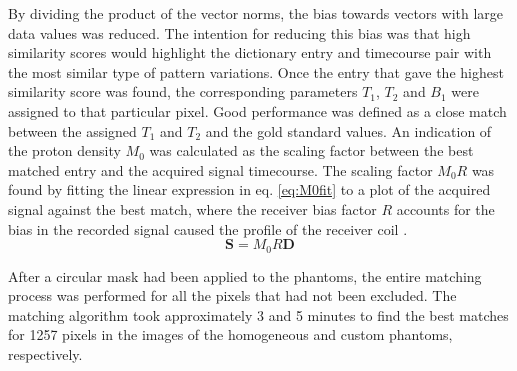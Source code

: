 \documentclass[journal]{IEEEtran}
\begin{document}
By dividing the product of the vector norms, the bias towards vectors with large data values was reduced. The intention for reducing this bias was that high similarity scores would highlight the dictionary entry and timecourse pair with the most similar type of pattern variations. Once the entry that gave the highest similarity score was found, the corresponding parameters $T_1$, $T_2$ and $B_1$ were assigned to that particular pixel. Good performance was defined as a close match between the assigned $T_1$ and $T_2$ and the gold standard values. An indication of the proton density $M_0$ was calculated as the scaling factor between the best matched entry and the acquired signal timecourse. The scaling factor $M_{0}R$ was found by fitting the linear expression in eq. \ref{eq:M0fit} to a plot of the acquired signal against the best match, where the receiver bias factor $R$ accounts for the bias in the recorded signal caused the profile of the receiver coil \cite{volz2012quantitative}.
\begin{equation} \label{eq:M0fit}
\boldsymbol{S} = M_{0}R\boldsymbol{D} 
\end{equation}

After a circular mask had been applied to the phantoms, the entire matching process was performed for all the pixels that had not been excluded. The matching algorithm took approximately 3 and 5 minutes to find the best matches for 1257 pixels in the images of the homogeneous and custom phantoms, respectively.
\end{document}
